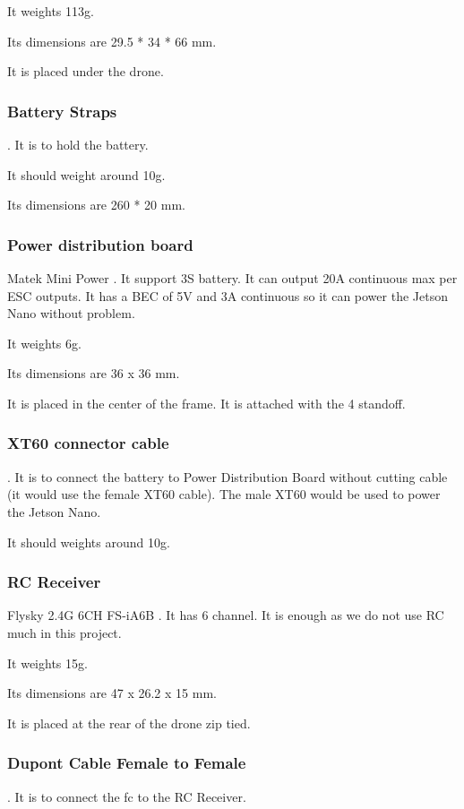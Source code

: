 It weights 113g.

Its dimensions are 29.5 * 34 * 66 mm.

It is placed under the drone.

\subsubsection{Battery Straps}
\cite{bangood_battery_strap}. It is to hold the battery.

It should weight around 10g.

Its dimensions are 260 * 20 mm.

\subsubsection{Power distribution board}
Matek Mini Power \cite{bangood_pdb}. It support 3S battery. It can output 20A continuous max per ESC outputs. It has a BEC of 5V and 3A continuous so it can power the Jetson Nano without problem.

It weights 6g.

Its dimensions are 36 x 36 mm.

It is placed in the center of the frame. It is attached with the 4 standoff.

\subsubsection{XT60 connector cable}
\cite{bangood_xt60_cable}. It is to connect the battery to Power Distribution Board without cutting cable (it would use the female XT60 cable). The male XT60 would be used to power the Jetson Nano.

It should weights around 10g.

\subsubsection{RC Receiver}
Flysky 2.4G 6CH FS-iA6B \cite{bangood_receiver}. It has 6 channel. It is enough as we do not use RC much in this project.

It weights 15g.

Its dimensions are 47 x 26.2 x 15 mm.

It is placed at the rear of the drone zip tied.

\subsubsection{Dupont Cable Female to Female}
\cite{bangood_dupont_cable}. It is to connect the \gls{fc} to the RC Receiver.

